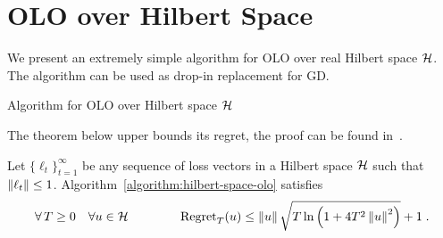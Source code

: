 \section{\acl{OLO} over Hilbert Space}

We present an extremely simple algorithm for \ac{OLO}
over real Hilbert space $\mathcal{H}$. The algorithm can be used as drop-in replacement for
\ac{GD}.

\begin{algorithm}[h]
\caption{Algorithm for OLO over Hilbert space $\mathcal{H}$
\label{algorithm:hilbert-space-olo}}
\begin{algorithmic}
{
\ENDFOR
}
\end{algorithmic}
\end{algorithm}

The theorem below upper bounds its regret,
the proof can be found in~\cite{Orabona-Pal-2016-parameter-free}.

\begin{theorem}
\label{theorem:hilbert-space-olo-regret}
Let $\{\ell_t\}_{t=1}^\infty$ be any sequence of loss vectors
in a Hilbert space $\mathcal{H}$ such that $\left\|{\ell_t}\right\| \le 1$.
Algorithm~\ref{algorithm:hilbert-space-olo} satisfies
$$
\forall \, T \ge 0 \quad
\forall u \in \mathcal{H} \qquad \qquad
\operatorname{Regret}_T(u) \le \left\|{u}\right\| \sqrt{T \ln\left(1 + 4T^2 \left\|{u}\right\|^2 \right)} + 1 \;.
$$
\end{theorem}
